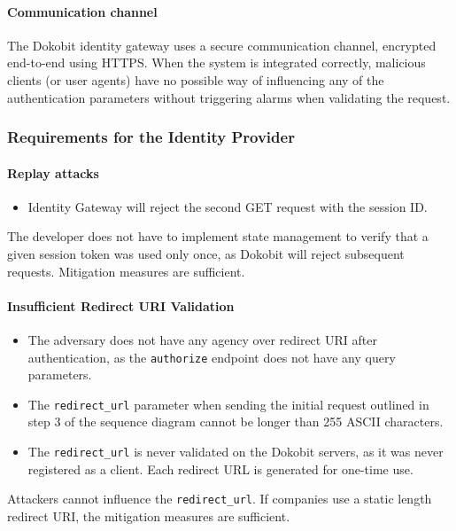 \paragraph{Communication channel}

The Dokobit identity gateway uses a secure communication channel, encrypted end-to-end using HTTPS. When the system is integrated correctly, malicious clients (or user agents) have no possible way of influencing any of the authentication parameters without triggering alarms when validating the request.

\subsubsection{Requirements for the Identity Provider}

\paragraph{Replay attacks}

\begin{itemize}
  \item Identity Gateway will reject the second GET request with the session ID.
\end{itemize}

The developer does not have to implement state management to verify that a given session token was used only once, as Dokobit will reject subsequent requests. Mitigation measures are sufficient.

\paragraph{Insufficient Redirect URI Validation}

\begin{itemize}
  \item The adversary does not have any agency over redirect URI after authentication, as the \texttt{authorize} endpoint does not have any query parameters.
  \item The \texttt{redirect\_url} parameter when sending the initial request outlined in step 3 of the sequence diagram cannot be longer than 255 ASCII characters.
  \item The \texttt{redirect\_url} is never validated on the Dokobit servers, as it was never registered as a client. Each redirect URL is generated for one-time use.
\end{itemize}

Attackers cannot influence the \texttt{redirect\_url}. If companies use a static length redirect URI, the mitigation measures are sufficient.

